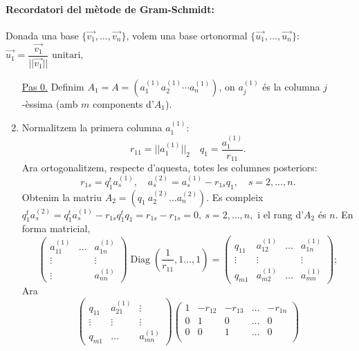\documentclass[11pt]{book}
\DeclareMathOperator{\diag}{Diag}
\newcommand{\norm}[1]{||#1||}
\begin{document}
\paragraph{Recordatori del mètode de Gram-Schmidt:} Donada una base $\{\vec{v_1},\ldots,\vec{v_n}\}$, volem una base ortonormal $\{\vec{u_1},\ldots,\vec{u_n}\}$:\\
$\vec{u_1}=\dfrac{\vec{v_1}}{\norm{\vec{v_1}}}\textrm{ unitari},$\\

\begin{enumerate}
    \item[\underline{Pas 0.}] Definim $A_1=A=(a_1^{(1)}a_2^{(1)}\cdots a_n^{(1)})$, on $a_j^{(1)}$ és la columna $j$-èssima (amb $m$ components d'$A_1$).
    \item Normalitzem la primera columna $a_1^{(1)}$:
    \[
    r_{11}=\norm{a_1^{(1)}}_2\quad q_1=\dfrac{a_1^{(1)}}{r_{11}}.
    \]
    Ara ortogonalitzem, respecte d'aquesta, totes les columnes posteriors:
    \[
    r_{1s}=q_1^ta_s^{(1)},\quad a_s^{(2)}=a_s^{(1)}-r_{1s}q_1,\quad s=2,\ldots,n.
    \]
    Obtenim la matriu $A_2=(q_1\ a_2^{(2)}\ldots a_n^{(2)})$. Es compleix $q_1^ta_s^{(2)}=q_1^ta_s^{(1)}-r_{1s}q_1^tq_1=r_{1s}-r_{1s}=0,\ s=2,\ldots,n,$ i el rang d'$A_2$ és $n$. En forma matricial,
    \[
    \begin{pmatrix}
        a_{11}^{(1)} & \ldots & a_{1n}^{(1)}\\
        \vdots & \ & \vdots\\
        \vdots & \ & a_{nn}^{(1)}
    \end{pmatrix}\diag\left(\dfrac{1}{r_{11}},1\ldots,1\right)=\begin{pmatrix}
    q_{11} & a_{12}^{(1)} & \ldots & a_{1n}^{(1)}\\
    \vdots & \vdots & \ & \vdots\\
    q_{m1} & a_{m2}^{(1)} & \ldots & a_{mn}^{(1)}
    \end{pmatrix};    
    \]
    Ara
    \[
    \begin{pmatrix}
    q_{11} & a_{21}^{(1)} & \vdots\\
    \vdots & \vdots & \vdots\\
    q_{m1} & \ldots & a_{mn}^{(1)}
    \end{pmatrix}\begin{pmatrix}
    1 & -r_{12} & -r_{13} & \ldots & -r_{1n}\\
    0 & 1 & 0 & \ldots & 0\\
    0 & 0 & 1 & \ldots & 0\\

\end{pmatrix}\]
\end{enumerate}
\end{document}
